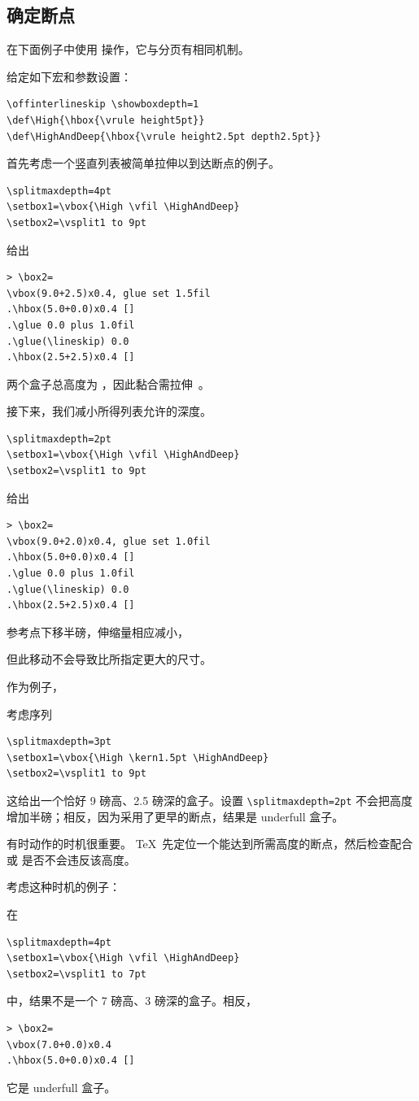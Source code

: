 \documentclass[a4paper]{rapport3}
\def\alt{}\def\altt{}%
\begin{document}
\subsection{确定断点}

在下面例子中使用  操作，它与分页有相同机制。

给定如下宏和参数设置：
\begin{verbatim}
\offinterlineskip \showboxdepth=1
\def\High{\hbox{\vrule height5pt}}
\def\HighAndDeep{\hbox{\vrule height2.5pt depth2.5pt}}
\end{verbatim}

首先考虑一个竖直列表被简单拉伸以到达断点的例子。
\begin{verbatim}
\splitmaxdepth=4pt 
\setbox1=\vbox{\High \vfil \HighAndDeep}
\setbox2=\vsplit1 to 9pt
\end{verbatim}
给出
\begin{verbatim}
> \box2=
\vbox(9.0+2.5)x0.4, glue set 1.5fil
.\hbox(5.0+0.0)x0.4 []
.\glue 0.0 plus 1.0fil
.\glue(\lineskip) 0.0
.\hbox(2.5+2.5)x0.4 []
\end{verbatim}
两个盒子总高度为 \n{7.5pt}，因此黏合需拉伸~\n{1.5pt}。

接下来，我们减小所得列表允许的深度。
\begin{verbatim}
\splitmaxdepth=2pt 
\setbox1=\vbox{\High \vfil \HighAndDeep}
\setbox2=\vsplit1 to 9pt
\end{verbatim}
给出
\begin{verbatim}
> \box2=
\vbox(9.0+2.0)x0.4, glue set 1.0fil
.\hbox(5.0+0.0)x0.4 []
.\glue 0.0 plus 1.0fil
.\glue(\lineskip) 0.0
.\hbox(2.5+2.5)x0.4 []
\end{verbatim}
参考点下移半磅，伸缩量相应减小，
\alt
但此移动不会导致比所指定更大的尺寸。

作为例子，
\alt
考虑序列
\begin{verbatim}
\splitmaxdepth=3pt 
\setbox1=\vbox{\High \kern1.5pt \HighAndDeep}
\setbox2=\vsplit1 to 9pt
\end{verbatim}
这给出一个恰好 9 磅高、2.5 磅深的盒子。设置 \verb>\splitmaxdepth=2pt>
不会把高度增加半磅；相反，因为采用了更早的断点，结果是 underfull 盒子。

有时动作的时机很重要。
\TeX\ 先定位一个能达到所需高度的断点，然后检查配合 
或  是否不会违反该高度。

考虑这种时机的例子：
\alt
在
\begin{verbatim}
\splitmaxdepth=4pt 
\setbox1=\vbox{\High \vfil \HighAndDeep}
\setbox2=\vsplit1 to 7pt
\end{verbatim}
中，结果{\italic 不是\/}一个 7 磅高、3 磅深的盒子。相反，
\begin{verbatim}
> \box2=
\vbox(7.0+0.0)x0.4
.\hbox(5.0+0.0)x0.4 []
\end{verbatim}
它是 underfull 盒子。
\end{document}
